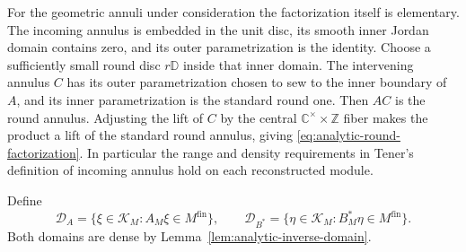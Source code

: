 \documentclass[11pt,a4paper]{article}
\theoremstyle{definition}
\begin{document}
For the geometric annuli under consideration the factorization itself
is elementary.  The incoming annulus is embedded in the unit disc,
its smooth inner Jordan domain contains zero, and its outer
parametrization is the identity.  Choose a sufficiently small round
disc $r\mathbb D$ inside that inner domain.  The intervening annulus
$C$ has its outer parametrization chosen to sew to the inner boundary
of $A$, and its inner parametrization is the standard round one.
Then $AC$ is the round annulus.  Adjusting the lift of $C$ by the
central $\mathbb C^\times\times\mathbb Z$ fiber makes the product
a lift of the standard round annulus, giving
\eqref{eq:analytic-round-factorization}.  In particular the range and
density requirements in Tener's definition of incoming annulus
\cite[Definition~4.2]{TenFields} hold on each reconstructed module.

Define
\begin{equation}
 \mathcal D_A=\{\xi\in\mathcal K_M:A_M\xi\in M^{\mathrm{fin}}\},
 \qquad
 \mathcal D_{B^*}=\{\eta\in\mathcal K_M:B_M^*\eta\in M^{\mathrm{fin}}\}.
\label{eq:analytic-annulus-domains}
\end{equation}
Both domains are dense by Lemma~\ref{lem:analytic-inverse-domain}.
\end{document}
